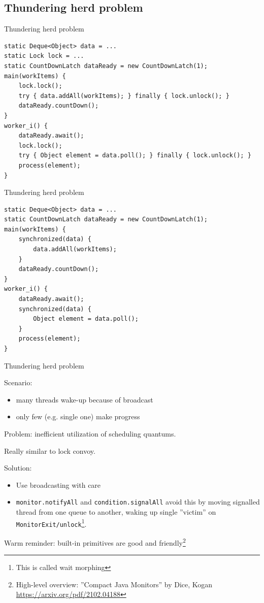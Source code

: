 \subsection{Thundering herd problem}
\showTOCSub


\begin{frame}[fragile]{Thundering herd problem}

\begin{verbatim}
static Deque<Object> data = ...
static Lock lock = ...
static CountDownLatch dataReady = new CountDownLatch(1);
main(workItems) {
    lock.lock(); 
    try { data.addAll(workItems); } finally { lock.unlock(); }
    dataReady.countDown();
}
worker_i() {
    dataReady.await();
    lock.lock(); 
    try { Object element = data.poll(); } finally { lock.unlock(); }
    process(element);
}
\end{verbatim}
\end{frame}


\begin{frame}{Thundering herd problem}

\begin{verbatim}
static Deque<Object> data = ...
static CountDownLatch dataReady = new CountDownLatch(1);
main(workItems) {
    synchronized(data) { 
        data.addAll(workItems); 
    }
    dataReady.countDown();
}
worker_i() {
    dataReady.await();
    synchronized(data) { 
        Object element = data.poll(); 
    }
    process(element);
}
\end{verbatim}
\end{frame}


\begin{frame}{Thundering herd problem}

    Scenario:
    \begin{itemize}
        \item many threads wake-up because of broadcast 
        \item only few (e.g. single one) make progress
    \end{itemize}

    \pause
    Problem: inefficient utilization of scheduling quantums.

    \pause
    Really similar to lock convoy.

    \pause

    Solution:
    \begin{itemize}
        \item Use broadcasting with care
        \item \texttt{monitor.notifyAll} and \texttt{condition.signalAll} avoid this by moving signalled thread from one queue to another, waking up single ''victim'' on \texttt{MonitorExit/unlock}\footnote<4->{This is called wait morphing}.
    \end{itemize}

    \pause
    Warm reminder: built-in primitives are good and friendly\footnote<5->{High-level overview: ''Compact Java Monitors'' by Dice, Kogan {\url{https://arxiv.org/pdf/2102.04188}}}

\end{frame}

